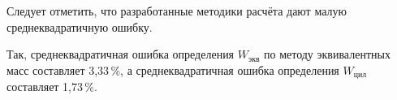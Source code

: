 Следует отметить, что разработанные методики расчёта дают малую среднеквадратичную ошибку.

Так, среднеквадратичная ошибка определения $W_\text{экв}$ по методу эквивалентных масс составляет 3,33\,{\%}, а среднеквадратичная  ошибка определения $ W_{\text{цил}}$ составляет 1,73\,{\%}.




%



%



%


%





